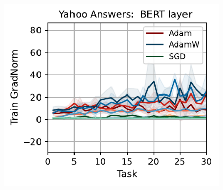 \begin{figure}[htb!]
{        \includegraphics[width=\textwidth]{figs/GradNorm/nlp/bert_layer/yahoo_answers_40.pdf}
    }\\
\end{figure}
